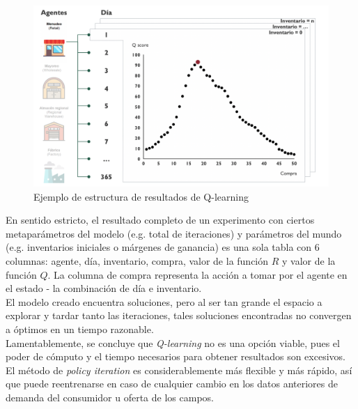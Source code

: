 \begin{figure}[H]
\caption{Ejemplo de estructura de resultados de Q-learning}
\label{q_learning_results}
\includegraphics[width=12cm]{tesis_tex/figs/q_learning_results.png}
\centering
\end{figure}

En sentido estricto, el resultado completo de un experimento con ciertos metapar\'ametros del modelo (e.g. total de iteraciones) y par\'ametros del mundo (e.g. inventarios iniciales o m\'argenes de ganancia) es una sola tabla con 6 columnas: agente, d\'ia, inventario, compra, valor de la funci\'on $R$ y valor de la funci\'on $Q$. La columna de compra representa la acci\'on a tomar por el agente en el estado - la combinaci\'on de d\'ia e inventario. \\

El modelo creado encuentra soluciones, pero al ser tan grande el espacio a explorar y tardar tanto las iteraciones, tales soluciones encontradas no convergen a \'optimos en un tiempo razonable.\\

Lamentablemente, se concluye que \textit{Q-learning} no es una opci\'on viable, pues el poder de c\'omputo y el tiempo necesarios para obtener resultados son excesivos. El m\'etodo de \textit{policy iteration} es considerablemente m\'as flexible y m\'as r\'apido, as\'i que puede reentrenarse en caso de cualquier cambio en los datos anteriores de demanda del consumidor u oferta de los campos.
